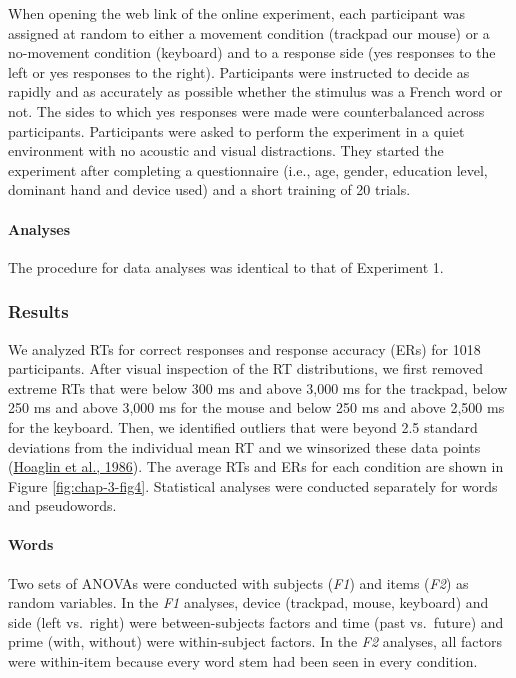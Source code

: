 \documentclass[
  a4paper,12pt,twoside,onecolumn,openright,final,oldfontcommands]{memoir}
\begin{document}
When opening the web link of the online experiment, each participant was assigned at random to either a movement condition (trackpad our mouse) or a no-movement condition (keyboard) and to a response side (yes responses to the left or yes responses to the right). Participants were instructed to decide as rapidly and as accurately as possible whether the stimulus was a French word or not. The sides to which yes responses were made were counterbalanced across participants. Participants were asked to perform the experiment in a quiet environment with no acoustic and visual distractions. They started the experiment after completing a questionnaire (i.e., age, gender, education level, dominant hand and device used) and a short training of 20 trials.

\hypertarget{analyses}{%
\paragraph{Analyses}\label{analyses}}

The procedure for data analyses was identical to that of Experiment 1.

\hypertarget{results-1}{%
\subsubsection{Results}\label{results-1}}

We analyzed RTs for correct responses and response accuracy (ERs) for 1018 participants. After visual inspection of the RT distributions, we first removed extreme RTs that were below 300 ms and above 3,000 ms for the trackpad, below 250 ms and above 3,000 ms for the mouse and below 250 ms and above 2,500 ms for the keyboard. Then, we identified outliers that were beyond 2.5 standard deviations from the individual mean RT and we winsorized these data points (\protect\hyperlink{ref-hoaglin_performance_1986}{Hoaglin et al., 1986}). The average RTs and ERs for each condition are shown in Figure \ref{fig:chap-3-fig4}. Statistical analyses were conducted separately for words and pseudowords.

\hypertarget{words-1}{%
\paragraph{Words}\label{words-1}}

Two sets of ANOVAs were conducted with subjects (\emph{F1}) and items (\emph{F2}) as random variables. In the \emph{F1} analyses, device (trackpad, mouse, keyboard) and side (left vs.~right) were between-subjects factors and time (past vs.~future) and prime (with, without) were within-subject factors. In the \emph{F2} analyses, all factors were within-item because every word stem had been seen in every condition.
\end{document}
